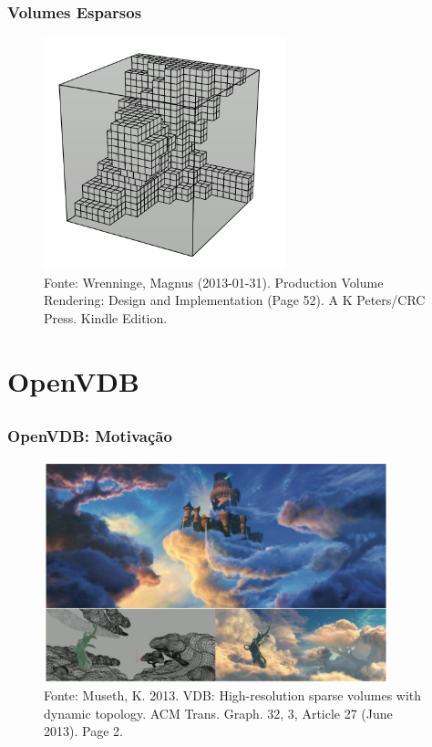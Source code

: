 \documentclass{beamer}
\begin{document}
\begin{frame}

\frametitle{Volumes Esparsos}

\begin{figure}[!htb]
\center
\includegraphics[width=7cm]{sparse}  
\caption*{\tiny Fonte: Wrenninge, Magnus (2013-01-31). Production Volume Rendering: Design and Implementation (Page 52). A K Peters/CRC Press. Kindle Edition.}
\end{figure}

\end{frame}



\section{OpenVDB}
\subsection{}
\begin{frame}

\frametitle{OpenVDB: Motivação}

\begin{figure}[!htb]
\center
\includegraphics[width=10cm]{puss}
\caption*{\tiny Fonte: Museth, K. 2013. VDB: High-resolution sparse volumes with dynamic topology. ACM Trans. Graph. 32, 3, Article 27 (June 2013). Page 2.}
\end{figure}

\end{frame}
\end{document}
